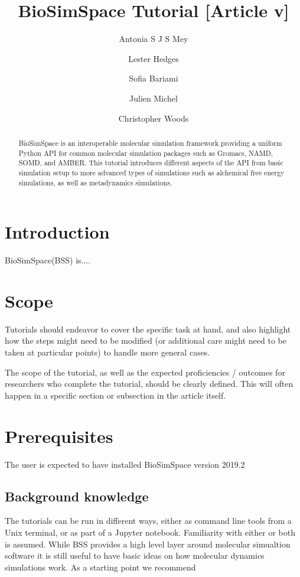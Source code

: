 \documentclass[9pt,tutorial]{livecoms}
\title{BioSimSpace Tutorial [Article v\versionnumber]}
\author[1*]{Antonia S J S Mey}
\author[1,2\authfn{1}\authfn{3}]{Lester Hedges}
\author[1]{Sofia Bariami}
\author[2\authfn{1}\authfn{4}]{Julien Michel}
\author[2*]{Christopher Woods}
\affil[1]{Edinburgh}
\affil[2]{Institution 2}
\begin{document}
\begin{frontmatter}
\maketitle

\begin{abstract}
BioSimSpace is an interoperable molecular simulation framework providing a uniform Python API for common molecular simulation packages such as Gromacs, NAMD, SOMD, and AMBER. This tutorial introduces different aspects of the API from basic simulation setup to more advanced types of simulations such as alchemical free energy simulations, as well as metadynamics simulations. 
\end{abstract}

\end{frontmatter}



\section{Introduction}
\label{sec:intro}
BioSimSpace(BSS) is....

\section{Scope}
\label{sec:scope}

Tutorials should endeavor to cover the specific task at hand, and also highlight how the steps might need to be modified (or additional care might need to be taken at particular points) to handle more general cases.

The scope of the tutorial, as well as the expected proficiencies / outcomes for researchers who complete the tutorial, should be clearly defined.
This will often happen in a specific section or subsection in the article itself.

\section{Prerequisites}
\label{sec:prerequisites}
The user is expected to have installed BioSimSpace version 2019.2 

\subsection{Background knowledge}
\label{subsec:background}
The tutorials can be run in different ways, either as command line tools from a Unix terminal, or as part of a Jupyter notebook. Familiarity with either or both is assumed. While BSS provides a high level layer around molecular simualtion software it is still useful to have basic ideas on how molecular dynamics simulations work. As a starting point we recommend 
\end{document}
